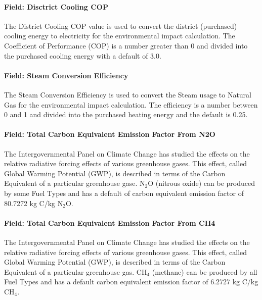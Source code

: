 \paragraph{Field: Disctrict Cooling COP}\label{field-disctrict-cooling-cop}

The District Cooling COP value is used to convert the district (purchased) cooling energy to electricity for the environmental impact calculation. The Coefficient of Performance (COP) is a number greater than 0 and divided into the purchased cooling energy with a default of 3.0.

\paragraph{Field: Steam Conversion Efficiency}\label{field-steam-conversion-efficiency}

The Steam Conversion Efficiency is used to convert the Steam usage to Natural Gas for the environmental impact calculation. The efficiency is a number between 0 and 1 and divided into the purchased heating energy and the default is 0.25.

\paragraph{Field: Total Carbon Equivalent Emission Factor From N2O}\label{field-total-carbon-equivalent-emission-factor-from-n2o}

The Intergovernmental Panel on Climate Change has studied the effects on the relative radiative forcing effects of various greenhouse gases. This effect, called Global Warming Potential (GWP), is described in terms of the Carbon Equivalent of a particular greenhouse gase. N\(_{2}\)O (nitrous oxide) can be produced by some Fuel Types and has a default of carbon equivalent emission factor of 80.7272 kg C/kg N\(_{2}\)O.

\paragraph{Field: Total Carbon Equivalent Emission Factor From CH4}\label{field-total-carbon-equivalent-emission-factor-from-ch4}

The Intergovernmental Panel on Climate Change has studied the effects on the relative radiative forcing effects of various greenhouse gases. This effect, called Global Warming Potential (GWP), is described in terms of the Carbon Equivalent of a particular greenhouse gas. CH\(_{4}\) (methane) can be produced by all Fuel Types and has a default carbon equivalent emission factor of 6.2727 kg C/kg CH\(_{4}\).

